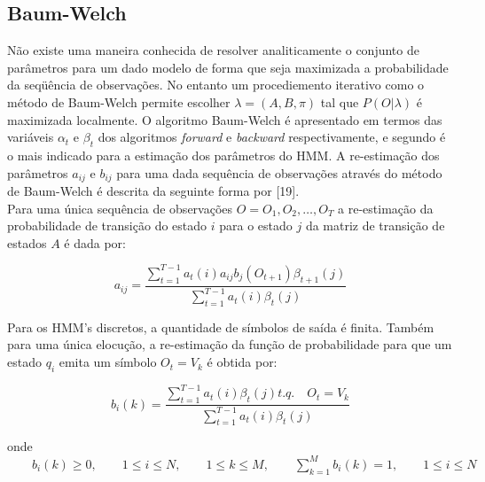 \subsection{Baum-Welch}
\label{secBW}
Não existe uma maneira conhecida de resolver analiticamente o conjunto de parâmetros para um dado modelo de forma que seja maximizada a probabilidade da seqüência de observações. No entanto um procediemento iterativo como o método de Baum-Welch  permite escolher $\lambda = (A, B, \pi)$ tal que $P(O|\lambda)$ é maximizada localmente. O algoritmo Baum-Welch é apresentado em termos das variáveis $\alpha_t$ e $\beta_t$ dos algoritmos \textit {forward} e \textit{backward} respectivamente, e segundo  \cite{artRabiner} é o mais indicado para a estimação dos parâmetros do HMM. A re-estimação dos parâmetros $a_{ij}$ e $b_{ij}$ para uma dada sequência de observações através do método de Baum-Welch é descrita da seguinte forma por [19].\\
Para uma única sequência de observações $O = {O_1, O_2, \ldots, O_T}$ a re-estimação da probabilidade de transição do estado $i$ para o estado $j$ da matriz de transição de estados $A$ é dada por:


\begin{equation}
\displaystyle a_{ij} = \frac{\sum_{t=1}^{T-1} a_t(i)a_{ij}b_j (O_{t+1}) \beta_{t+1}(j)}{\sum_{t=1}^{T-1} a_t(i)\beta_t(j)}
\end{equation}


Para os HMM’s discretos, a quantidade de símbolos de saída é finita. Também para uma
única elocução, a re-estimação da função de probabilidade para que um estado $q_i$ emita um símbolo $O_t = V_k $ é obtida por:

\begin{equation}
\displaystyle  b_i(k) = \frac{\sum_{t=1}^{T-1} a_t(i)\beta_t(j) t.q. \quad O_t = V_k}{\sum_{t=1}^{T-1} a_t(i)\beta_t(j)}
\end{equation}

onde $ \displaystyle \qquad b_i(k) \geq 0, \qquad 1\leq i \leq N, \qquad 1 \leq k \leq M, \qquad \sum_{k=1}^M b_i(k) = 1, \qquad 1 \leq i \leq N$














